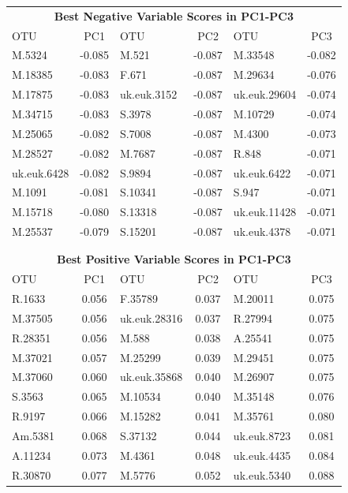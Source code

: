 \documentclass[10pt]{beamer}
\begin{document}
\begin{frame}[fragile]
\label{otuscores}
{\scriptsize
\begin{center}
\begin{tabular}{lc|lc|lc}
\multicolumn{6}{c}{\bf Best Negative Variable Scores in PC1-PC3}\\
OTU	& PC1	  & OTU 	& PC2	        & OTU 	        & PC3\\ \hline
M.5324	& -0.085  & M.521	& -0.087	& M.33548	& -0.082\\
M.18385	& -0.083  & F.671	& -0.087	& M.29634	& -0.076\\
M.17875	& -0.083  & uk.euk.3152	& -0.087	& uk.euk.29604	& -0.074\\
M.34715	& -0.083  & S.3978	& -0.087	& M.10729	& -0.074\\
M.25065	& -0.082  & S.7008	& -0.087	& M.4300	& -0.073\\
M.28527	& -0.082  & M.7687	& -0.087	& R.848	        & -0.071\\
uk.euk.6428 & -0.082 & S.9894	& -0.087	& uk.euk.6422	& -0.071 \\
M.1091	& -0.081  & S.10341	& -0.087	& S.947	        & -0.071\\
M.15718	& -0.080  & S.13318	& -0.087	& uk.euk.11428	& -0.071\\
M.25537	& -0.079  & S.15201	& -0.087	& uk.euk.4378	& -0.071\\ \hline
\multicolumn{6}{l}{ }\\					
\multicolumn{6}{l}{ }\\					
\multicolumn{6}{c}{\bf Best Positive Variable Scores in PC1-PC3}\\
OTU	& PC1	  & OTU 	& PC2	        & OTU 	        & PC3\\ \hline
R.1633	& 0.056	& F.35789	& 0.037	& M.20011	& 0.075\\
M.37505	& 0.056	& uk.euk.28316	& 0.037	& R.27994	& 0.075\\
R.28351	& 0.056	& M.588	        & 0.038	& A.25541	& 0.075\\
M.37021	& 0.057	& M.25299	& 0.039	& M.29451	& 0.075\\
M.37060	& 0.060	& uk.euk.35868	& 0.040	& M.26907	& 0.075\\
S.3563	& 0.065	& M.10534	& 0.040	& M.35148	& 0.076\\
R.9197	& 0.066	& M.15282	& 0.041	& M.35761	& 0.080\\
Am.5381	& 0.068	& S.37132	& 0.044	& uk.euk.8723	& 0.081\\
A.11234	& 0.073	& M.4361	& 0.048	& uk.euk.4435	& 0.084\\
R.30870	& 0.077	& M.5776	& 0.052	& uk.euk.5340	& 0.088\\\hline
\end{tabular}
\end{center}
}
\end{frame}
\end{document}
